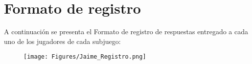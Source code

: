 
\chapter{Formato de registro} %

\label{App_Registro} %

A continuación se presenta el Formato de registro de respuestas entregado a cada uno de los jugadores de cada subjuego:

\begin{figure}[th]
\centering
\texttt{[image: Figures/Jaime\_Registro.png]} 
\label{fig:csv}
\end{figure}

